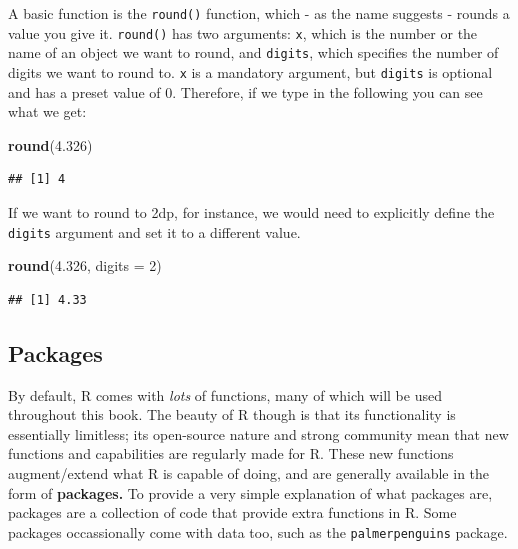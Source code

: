 \documentclass[
]{book}
\newenvironment{Shaded}{\begin{snugshade}}{\end{snugshade}}
\newcommand{\AttributeTok}[1]{\textcolor[rgb]{0.13,0.29,0.53}{#1}}
\newcommand{\DecValTok}[1]{\textcolor[rgb]{0.00,0.00,0.81}{#1}}
\newcommand{\FloatTok}[1]{\textcolor[rgb]{0.00,0.00,0.81}{#1}}
\newcommand{\FunctionTok}[1]{\textcolor[rgb]{0.13,0.29,0.53}{\textbf{#1}}}
\newcommand{\NormalTok}[1]{#1}
\begin{document}
A basic function is the \texttt{round()} function, which - as the name suggests - rounds a value you give it. \texttt{round()} has two arguments: \texttt{x}, which is the number or the name of an object we want to round, and \texttt{digits}, which specifies the number of digits we want to round to. \texttt{x} is a mandatory argument, but \texttt{digits} is optional and has a preset value of 0. Therefore, if we type in the following you can see what we get:

\begin{Shaded}
\begin{Highlighting}[]
\FunctionTok{round}\NormalTok{(}\FloatTok{4.326}\NormalTok{)}
\end{Highlighting}
\end{Shaded}

\begin{verbatim}
## [1] 4
\end{verbatim}

If we want to round to 2dp, for instance, we would need to explicitly define the \texttt{digits} argument and set it to a different value.

\begin{Shaded}
\begin{Highlighting}[]
\FunctionTok{round}\NormalTok{(}\FloatTok{4.326}\NormalTok{, }\AttributeTok{digits =} \DecValTok{2}\NormalTok{)}
\end{Highlighting}
\end{Shaded}

\begin{verbatim}
## [1] 4.33
\end{verbatim}

\hypertarget{packages}{%
\subsection{Packages}\label{packages}}

By default, R comes with \emph{lots} of functions, many of which will be used throughout this book. The beauty of R though is that its functionality is essentially limitless; its open-source nature and strong community mean that new functions and capabilities are regularly made for R. These new functions augment/extend what R is capable of doing, and are generally available in the form of \textbf{packages.} To provide a very simple explanation of what packages are, packages are a collection of code that provide extra functions in R. Some packages occassionally come with data too, such as the \texttt{palmerpenguins} package.
\end{document}
